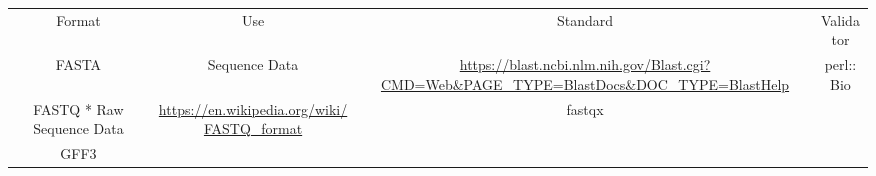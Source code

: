 \begin{tabular}{cccc}
{Format} & {Use} & {Standard} & {Validator} \\
FASTA & Sequence Data & \url{https://blast.ncbi.nlm.nih.gov/Blast.cgi?CMD=Web&PAGE_TYPE=BlastDocs&DOC_TYPE=BlastHelp} & perl::Bio \\
FASTQ * Raw Sequence Data & \url{https://en.wikipedia.org/wiki/FASTQ_format} & fastqx \\
GFF3 
\end{tabular}